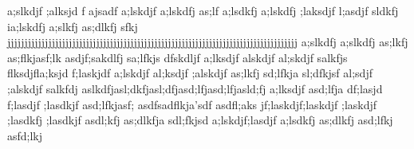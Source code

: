a;slkdjf ;alksjd f                ajsadf                                                                           a;lskdjf a;lskdfj as;lf                                                                                        a;lsdkfj a;lskdfj ;laksdjf l;asdjf sldkfj                                                                                                                           ia;lskdfj a;slkfj as;dlkfj sfkj jjjjjjjjjjjjjjjjjjjjjjjjjjjjjjjjjjjjjjjjjjjjjjjjjjjjjjjjjjjjjjjjjjjjjjjjjjjjjjjjjjjjj                                           a;slkdfj a;slkdfj as;lkfj as;flkjasf;lk asdjf;sakdlfj sa;lfkjs dfskdljf a;lksdjf  alskdjf al;skdjf salkfjs flksdjfla;ksjd f;laskjdf                                                                                                             a;lskdjf al;ksdjf ;alskdjf as;lkfj sd;lfkja sl;dfkjsf                           al;sdjf ;alskdjf salkfdj                                                                                                                                         aslkdfjasl;dkfjasl;dfjasd;lfjasd;lfjasld;fj               a;lksdjf                                                                                                                                                asd;lfja df;lasjd f;lasdjf ;lasdkjf asd;lfkjasf; asdfsadflkja'sdf                        asdfl;aks jf;laskdjf;laskdjf ;laskdjf ;lasdkfj ;lasdkjf asdl;kfj as;dlkfja sdl;fkjsd                                                                                           a;lskdjf;lasdjf a;lsdkfj as;dlkfj asd;lfkj asfd;lkj                          
